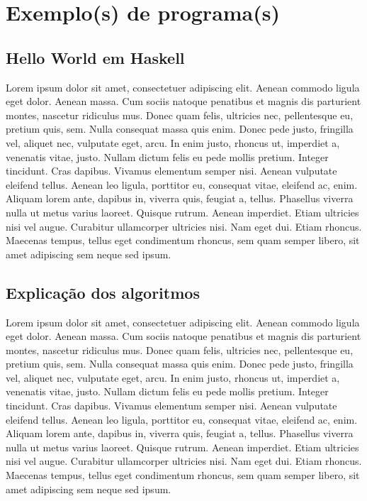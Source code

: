 \chapter{Exemplo(s) de programa(s)}

\setcounter{section}{0}

\section{Hello World em Haskell}

    Lorem ipsum dolor sit amet, consectetuer adipiscing 
    elit. Aenean commodo ligula eget dolor. Aenean massa.
    Cum sociis natoque penatibus et magnis dis parturient
    montes, nascetur ridiculus mus. Donec quam felis, 
    ultricies nec, pellentesque eu, pretium quis, sem. 
    Nulla consequat massa quis enim. Donec pede justo, 
    fringilla vel, aliquet nec, vulputate eget, arcu. In 
    enim justo, rhoncus ut, imperdiet a, venenatis vitae,
    justo. Nullam dictum felis eu pede mollis pretium. 
    Integer tincidunt. Cras dapibus. Vivamus elementum 
    semper nisi. Aenean vulputate eleifend tellus. Aenean 
    leo ligula, porttitor eu, consequat vitae, eleifend 
    ac, enim. Aliquam lorem ante, dapibus in, viverra 
    quis, feugiat a, tellus. Phasellus viverra nulla ut 
    metus varius laoreet. Quisque rutrum. Aenean imperdiet.
    Etiam ultricies nisi vel augue. Curabitur ullamcorper 
    ultricies nisi. Nam eget dui. Etiam rhoncus. Maecenas 
    tempus, tellus eget condimentum rhoncus, sem quam 
    semper libero, sit amet adipiscing sem neque sed ipsum.

\section{Explicação dos algoritmos}

    Lorem ipsum dolor sit amet, consectetuer adipiscing 
    elit. Aenean commodo ligula eget dolor. Aenean massa.
    Cum sociis natoque penatibus et magnis dis parturient
    montes, nascetur ridiculus mus. Donec quam felis, 
    ultricies nec, pellentesque eu, pretium quis, sem. 
    Nulla consequat massa quis enim. Donec pede justo, 
    fringilla vel, aliquet nec, vulputate eget, arcu. In 
    enim justo, rhoncus ut, imperdiet a, venenatis vitae,
    justo. Nullam dictum felis eu pede mollis pretium. 
    Integer tincidunt. Cras dapibus. Vivamus elementum 
    semper nisi. Aenean vulputate eleifend tellus. Aenean 
    leo ligula, porttitor eu, consequat vitae, eleifend 
    ac, enim. Aliquam lorem ante, dapibus in, viverra 
    quis, feugiat a, tellus. Phasellus viverra nulla ut 
    metus varius laoreet. Quisque rutrum. Aenean imperdiet.
    Etiam ultricies nisi vel augue. Curabitur ullamcorper 
    ultricies nisi. Nam eget dui. Etiam rhoncus. Maecenas 
    tempus, tellus eget condimentum rhoncus, sem quam 
    semper libero, sit amet adipiscing sem neque sed ipsum.

